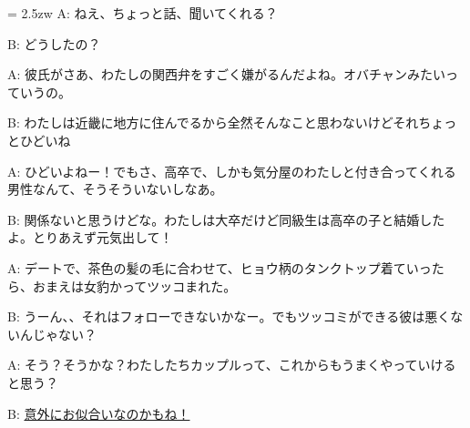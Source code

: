 \documentclass[11pt]{amsart}
\title{}
\author{}
\newenvironment{hangall}[1]{\hangindent = 2.5zw\everypar{\hangindent = 2.5zw}}{}
\begin{document}
\maketitle
\begin{hangall}{}%
A: ねえ、ちょっと話、聞いてくれる？

B: どうしたの？

A: 彼氏がさあ、わたしの関西弁をすごく嫌がるんだよね。オバチャンみたいっていうの。

B: わたしは近畿に地方に住んでるから全然そんなこと思わないけどそれちょっとひどいね

A: ひどいよねー！でもさ、高卒で、しかも気分屋のわたしと付き合ってくれる男性なんて、そうそういないしなあ。

B: 関係ないと思うけどな。わたしは大卒だけど同級生は高卒の子と結婚したよ。とりあえず元気出して！

A: デートで、茶色の髪の毛に合わせて、ヒョウ柄のタンクトップ着ていったら、おまえは女豹かってツッコまれた。

B: うーん、、それはフォローできないかなー。でもツッコミができる彼は悪くないんじゃない？

A: そう？そうかな？わたしたちカップルって、これからもうまくやっていけると思う？

B: \ul{意外にお似合いなのかもね！}\end{hangall}
\end{document}
